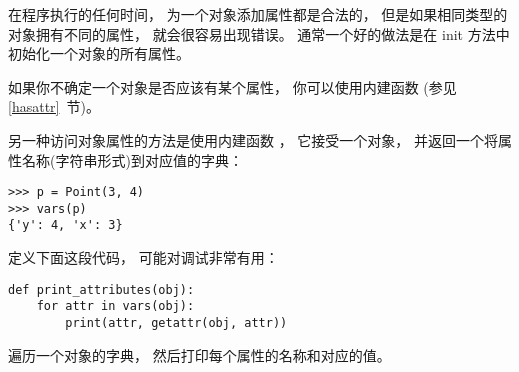 
在程序执行的任何时间， 为一个对象添加属性都是合法的，
但是如果相同类型的对象拥有不同的属性， 就会很容易出现错误。
通常一个好的做法是在 init 方法中初始化一个对象的所有属性。

  


如果你不确定一个对象是否应该有某个属性， 你可以使用内建函数 
 (参见 \ref{hasattr}~节)。

  


另一种访问对象属性的方法是使用内建函数 ，
它接受一个对象， 并返回一个将属性名称(字符串形式)到对应值的字典：

\begin{lstlisting}
>>> p = Point(3, 4)
>>> vars(p)
{'y': 4, 'x': 3}
\end{lstlisting}

%

定义下面这段代码， 可能对调试非常有用：

\begin{lstlisting}
def print_attributes(obj):
    for attr in vars(obj):
        print(attr, getattr(obj, attr))
\end{lstlisting}

%

 遍历一个对象的字典，
然后打印每个属性的名称和对应的值。

  


